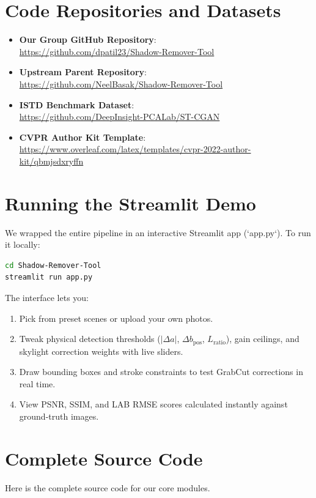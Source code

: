 \documentclass[10pt,twocolumn,letterpaper]{article}
\begin{document}
\section{Code Repositories and Datasets}
\label{sec:links}
\begin{itemize}
    \item \textbf{Our Group GitHub Repository}:\\
    \url{https://github.com/dpatil23/Shadow-Remover-Tool}
    \item \textbf{Upstream Parent Repository}:\\
    \url{https://github.com/NeelBasak/Shadow-Remover-Tool}
    \item \textbf{ISTD Benchmark Dataset}:\\
    \url{https://github.com/DeepInsight-PCALab/ST-CGAN}
    \item \textbf{CVPR Author Kit Template}:\\
    \url{https://www.overleaf.com/latex/templates/cvpr-2022-author-kit/qbmjsdxryffn}
\end{itemize}

\section{Running the Streamlit Demo}
\label{sec:app_guide}
We wrapped the entire pipeline in an interactive Streamlit app (`app.py`). To run it locally:
\begin{lstlisting}[language=bash]
cd Shadow-Remover-Tool
streamlit run app.py
\end{lstlisting}
The interface lets you:
\begin{enumerate}
    \item Pick from preset scenes or upload your own photos.
    \item Tweak physical detection thresholds ($|\Delta a|$, $\Delta b_{\text{pos}}$, $L_{\text{ratio}}$), gain ceilings, and skylight correction weights with live sliders.
    \item Draw bounding boxes and stroke constraints to test GrabCut corrections in real time.
    \item View PSNR, SSIM, and LAB RMSE scores calculated instantly against ground-truth images.
\end{enumerate}

\section{Complete Source Code}
\label{sec:code}
Here is the complete source code for our core modules.
\end{document}
